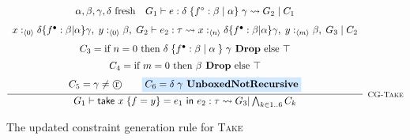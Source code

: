 \begin{figure}
    \centering
    \[
        \infer[\textsc{\footnotesize{CG-Take}}]{
            G_1 \vdash \textsf{take } x\; \{ f = y \} = e_1 \textsf{ in } e_2
                : \tau \rightsquigarrow G_3 | \bigwedge_{k \in 1..6} C_k
        }{
            \begin{array}{c}
                \alpha, \beta, \gamma, \delta \text{ fresh}
                \hspace{1em}
                G_1 \vdash e : \delta\; \{ f^\circ : \beta\; |\; \alpha \}\;
                    \gamma \rightsquigarrow G_2\; |\; C_1 \\[7pt]
                x :_{\langle 0 \rangle} \delta \{ f^\bullet : \beta | \alpha \} \gamma,\;
                    y :_{\langle 0 \rangle} \beta,\;
                    G_2 \vdash e_2 : \tau 
                     \rightsquigarrow     
                    x :_{\langle n \rangle} \delta \{ f^\bullet : \beta | \alpha \} \gamma,\;
                    y :_{\langle m \rangle} \beta,\;
                    G_3\; |\; C_2 \\[7pt]
                C_3 = \text{if } n = 0 \text{ then } 
                    \delta\; \{ f^\bullet : \beta\; |\; \alpha\; \}\; \gamma \textbf{ Drop}
                    \text{ else } \top \\[5pt]
                C_4 = \text{if } m = 0 \text{ then } 
                    \beta \textbf{ Drop}
                    \text{ else } \top \\[5pt]
                C_5 = \gamma \neq \text{\textcircled{r}}
                \hspace{2em}
                \colorbox{highlighteq}{$C_6 = \delta\; \gamma \textbf{ UnboxedNotRecursive}$}
            \end{array}
        }
    \]
    
    \caption{The updated constraint generation rule for \textsc{Take}}
    \label{fig:takeconstraintgen}
\end{figure}

